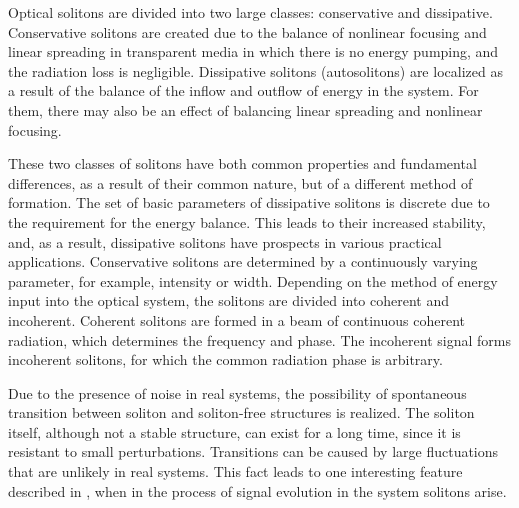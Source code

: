 Optical solitons are divided into two large classes: conservative and dissipative. Conservative solitons are created due to the balance of nonlinear focusing and linear spreading in transparent media in which there is no energy pumping, and the radiation loss is negligible. Dissipative solitons (autosolitons) are localized as a result of the balance of the inflow and outflow of energy in the system. For them, there may also be an effect of balancing linear spreading and nonlinear focusing.


These two classes of solitons have both common properties and fundamental differences, as a result of their common nature, but of a different method of formation. The set of basic parameters of dissipative solitons is discrete due to the requirement for the energy balance. This leads to their increased stability, and, as a result, dissipative solitons have prospects in various practical applications. Conservative solitons are determined by a continuously varying parameter, for example, intensity or width. Depending on the method of energy input into the optical system, the solitons are divided into coherent and incoherent. Coherent solitons are formed in a beam of continuous coherent radiation, which determines the frequency and phase. The incoherent signal forms incoherent solitons, for which the common radiation phase is arbitrary.

Due to the presence of noise in real systems, the possibility of spontaneous transition between soliton and soliton-free structures is realized. The soliton itself, although not a stable structure, can exist for a long time, since it is resistant to small perturbations. Transitions can be caused by large fluctuations that are unlikely in real systems. This fact leads to one interesting feature described in \cite{randoux16inverse}, when in the process of signal evolution in the system solitons arise.

